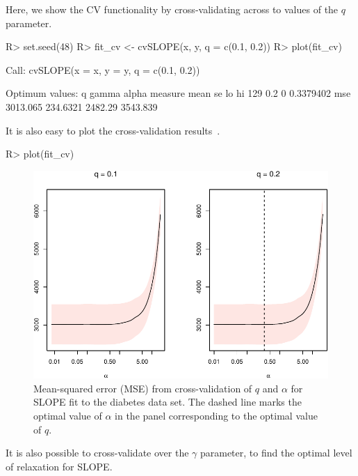 \documentclass[article]{jss}
\makeatletter
\let\Cref\crtCref
\let\natwidth\Gin@nat@width
\makeatother
\begin{document}
Here, we show the CV functionality by cross-validating across
to values of the \(q\) parameter.

\begin{CodeChunk}
  \begin{CodeInput}
R> set.seed(48)
R> fit_cv <- cvSLOPE(x, y, q = c(0.1, 0.2))
R> plot(fit_cv)
\end{CodeInput}
  \begin{CodeOutput}
Call:
cvSLOPE(x = x, y = y, q = c(0.1, 0.2))

Optimum values:
      q gamma     alpha measure     mean       se      lo       hi
129 0.2     0 0.3379402     mse 3013.065 234.6321 2482.29 3543.839
\end{CodeOutput}
\end{CodeChunk}

It is also easy to plot the cross-validation results~\Cref{fig:cv}.

\begin{Code}
R> plot(fit_cv)
\end{Code}

\begin{figure}[tp]
  \centering
  \includegraphics[width=\natwidth]{images/slope-cv.pdf}
  \caption{%
    Mean-squared error (MSE) from cross-validation of
    \(q\) and \(\alpha\) for SLOPE fit to the diabetes data set.
    The dashed line marks the optimal value of \(\alpha\) in the
    panel corresponding to the optimal value of \(q\).
  }
  \label{fig:cv}
\end{figure}

It is also possible to cross-validate over the \(\gamma\) parameter, to
find the optimal level of relaxation for SLOPE.
\end{document}
